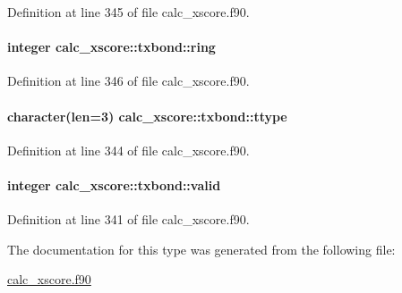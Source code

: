 Definition at line 345 of file calc\-\_\-xscore.\-f90.

\hypertarget{structcalc__xscore_1_1txbond_a7e9a632c5e5c0726a62ff37c34fd256c}{
\paragraph[{ring}]{\setlength{\rightskip}{0pt plus 5cm}integer calc\-\_\-xscore\-::txbond\-::ring}}\label{structcalc__xscore_1_1txbond_a7e9a632c5e5c0726a62ff37c34fd256c}


Definition at line 346 of file calc\-\_\-xscore.\-f90.

\hypertarget{structcalc__xscore_1_1txbond_a84d8fad8b1e0570b1f65f79fcd26e39e}{
\paragraph[{ttype}]{\setlength{\rightskip}{0pt plus 5cm}character(len=3) calc\-\_\-xscore\-::txbond\-::ttype}}\label{structcalc__xscore_1_1txbond_a84d8fad8b1e0570b1f65f79fcd26e39e}


Definition at line 344 of file calc\-\_\-xscore.\-f90.

\hypertarget{structcalc__xscore_1_1txbond_a3cea2cd9a29a709b6ce87083479f5fe1}{
\paragraph[{valid}]{\setlength{\rightskip}{0pt plus 5cm}integer calc\-\_\-xscore\-::txbond\-::valid}}\label{structcalc__xscore_1_1txbond_a3cea2cd9a29a709b6ce87083479f5fe1}


Definition at line 341 of file calc\-\_\-xscore.\-f90.



The documentation for this type was generated from the following file\-:\begin{DoxyCompactItemize}
\item 
\hyperlink{calc__xscore_8f90}{calc\-\_\-xscore.\-f90}\end{DoxyCompactItemize}
